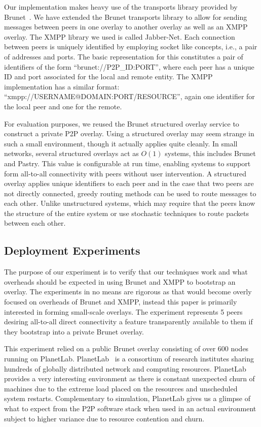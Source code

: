\documentclass[conference]{IEEEtran}
\begin{document}
Our implementation makes heavy use of the transports library provided by
Brunet~\cite{brunet}.  We have extended the Brunet transports library to allow
for sending messages between peers in one overlay to another overlay as well as
an XMPP overlay.  The XMPP library we used is called Jabber-Net.  Each
connection between peers is uniquely identified by employing socket like
concepts, i.e., a pair of addresses and ports.  The basic representation for
this constitutes a pair of identifiers of the form ``brunet://P2P\_ID:PORT'',
where each peer has a unique ID and port associated for the local and remote
entity.  The XMPP implementation has a similar format:
``xmpp://USERNAME@DOMAIN:PORT/RESOURCE'', again one identifier for the local
peer and one for the remote.

For evaluation purposes, we reused the Brunet structured overlay service to
construct a private P2P overlay.  Using a structured overlay may seem strange
in such a small environment, though it actually applies quite cleanly.  In
small networks, several structured overlays act as $O(1)$ systems, this
includes Brunet and Pastry.  This value is configurable at run time, enabling
systems to support form all-to-all connectivity with peers without user
intervention.  A structured overlay applies unique identifiers to each peer and
in the case that two peers are not directly connected, greedy routing methods
can be used to route messages to each other.  Unlike unstructured systems,
which may require that the peers know the structure of the entire system or use
stochastic techniques to route packets between each other.

\subsection{Deployment Experiments}

The purpose of our experiment is to verify that our techniques work and what
overheads should be expected in using Brunet and XMPP to bootstrap an overlay.
The experiments in no means are rigorous as that would become overly focused on
overheads of Brunet and XMPP, instead this paper is primarily interested in
forming small-scale overlays.  The experiment represents 5 peers desiring
all-to-all direct connectivity a feature transparently available to them if
they bootstrap into a private Brunet overlay.

This experiment relied on a public Brunet overlay consisting of over 600 nodes
running on PlanetLab.  PlanetLab~\cite{planetlab} is a consortium of research
institutes sharing hundreds of globally distributed network and computing
resources.  PlanetLab provides a very interesting environment as there is
constant unexpected churn of machines due to the extreme load placed on the
resources and unscheduled system restarts.  Complementary to simulation,
PlanetLab gives us a glimpse of what to expect from the P2P software stack when
used in an actual environment subject to higher variance due to resource
contention and churn.
\end{document}
